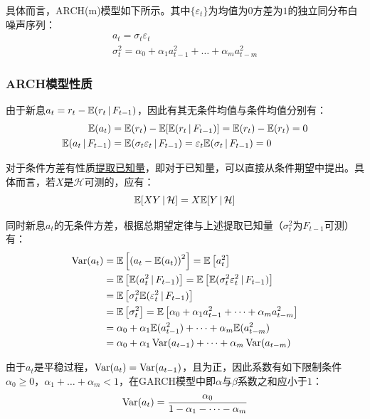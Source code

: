 \documentclass[11pt]{article}
\begin{document}
具体而言，ARCH(m)模型如下所示。其中$\{\varepsilon_t\}$为均值为$0$方差为$1$的独立同分布白噪声序列：
\begin{gather*}
    a_t = \sigma_t \varepsilon_t \\
    \sigma_t^2 = \alpha_0 + \alpha_1 a_{t-1}^2 + \dots + \alpha_m a_{t-m}^2
\end{gather*}

\subsubsection{ARCH模型性质}

由于新息$a_t = r_t - \mathbb{E}(r_t \,\vert\, F_{t-1})$，因此有其无条件均值与条件均值分别有：
\begin{align*}
    \mathbb{E}(a_t) &= \mathbb{E}(r_t) - \mathbb{E}[\mathbb{E}(r_t \,\vert\, F_{t-1})] = \mathbb{E}(r_t) - \mathbb{E}(r_t) = 0 \\
    \mathbb{E}(a_t \,\vert\, F_{t-1}) &= \mathbb{E}(\sigma_t \varepsilon_t \,\vert\, F_{t-1}) = \varepsilon_t \mathbb{E}(\sigma_t \,\vert\, F_{t-1}) = 0
\end{align*}

对于条件方差有性质\uline{提取已知量}，即对于已知量，可以直接从条件期望中提出。具体而言，若$X$是$\mathcal{H}$可测的，应有：
\begin{equation*}
    \mathbb{E}[X Y\,\vert\, \mathcal{H}] = X \mathbb{E}[Y \,\vert\, \mathcal{H}] 
\end{equation*}

同时新息$a_t$的无条件方差，根据总期望定律与上述提取已知量（$\sigma_{t}^{2}$为$F_{t-1}$可测）有：
\begin{align*}
    \operatorname{Var}(a_t) &= \mathbb{E}\left[\left(a_t - \mathbb{E}(a_t)\right)^2\right]
    = \mathbb{E}\left[ a_t^2 \right] \\
    &= \mathbb{E}\left[ \mathbb{E}(a_t^2 \,\vert\, F_{t-1}) \right]
    = \mathbb{E}\left[ \mathbb{E}(\sigma_t^2 \varepsilon_t^2 \,\vert\, F_{t-1}) \right] \\
    &= \mathbb{E}\left[ \sigma_t^2 \mathbb{E}( \varepsilon_t^2 \,\vert\, F_{t-1}) \right] \\
    &= \mathbb{E}\left[ \sigma_t^2 \right] = \mathbb{E} \left[ \alpha_0 + \alpha_1 a_{t-1}^2 + \dots + \alpha_m a_{t-m}^{2} \right] \\
    &= \alpha_0 + \alpha_1 \mathbb{E}(a_{t-1}^{2}) + \dots + \alpha_m \mathbb{E}(a_{t-m}^{2}) \\
    &= \alpha_0 + \alpha_1 \operatorname{Var}(a_{t-1}) + \dots + \alpha_m \operatorname{Var}(a_{t-m})
\end{align*}

由于$a_t$是平稳过程，$\operatorname{Var}(a_{t}) = \operatorname{Var}(a_{t-1})$，且为正，因此系数有如下限制条件$\alpha_0 \geq 0$，$\alpha_1+\dots+\alpha_m<1$，在GARCH模型中即$\alpha$与$\beta$系数之和应小于$1$：
\begin{equation*}
    \operatorname{Var}(a_t) = \frac{\alpha_0}{1-\alpha_1 - \dots - \alpha_m}
\end{equation*}
\end{document}
